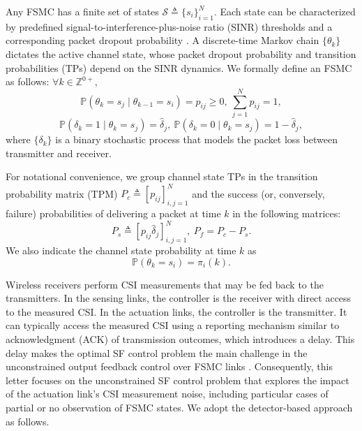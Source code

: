 \documentclass[journal,twoside,web]{ieeecolor}
\begin{document}
Any FSMC has a finite set of states $\mathcal{S}\triangleq\{s_i\}_{i=1}^{N}$. Each state can be characterized by predefined signal-to-interference-plus-noise ratio (SINR) thresholds and a corresponding packet dropout probability \cite{zacchialun2024access}. A discrete-time Markov chain $\{\theta_k\}$ dictates the active channel state, whose packet dropout probability and transition probabilities (TPs) depend on the SINR dynamics. We formally define an FSMC as follows: $\forall k\in \mathbb{Z}^{0+}$,
\begin{equation}\label{eq:p-ij}
    \mathbb{P}(\theta_{k} = s_j \mid \theta_{k-1} = s_i) = p_{ij} \geq 0,~ \sum_{j=1}^N p_{ij} = 1,
\end{equation}
\begin{equation}\label{eq:p-delta}
    \mathbb{P}(\delta_k = 1 \mid \theta_{k} = s_j) = \hat{\delta}_{j},~
    \mathbb{P}(\delta_k = 0 \mid \theta_{k} = s_j) = 1 - \hat{\delta}_{j},
\end{equation}
where $\{\delta_k\}$ is a binary stochastic process that models the packet loss between transmitter and receiver.

For notational convenience, we group
channel state TPs in the transition probability matrix (TPM) $P_{c}^{} \triangleq [p_{ij}]_{i,j=1}^{N}$
and the  success (or, conversely, failure) probabilities of delivering a packet at time $k$ in the following matrices:
\begin{equation}\label{eq:Ps}
    P_{s}^{} \triangleq [p_{ij}\hat{\delta}_{j}]_{i,j=1}^{N},~P_{f} = P_{c} - P_{s}.
\end{equation}
We also indicate the channel state probability at time $k$ as
\begin{equation}\label{eq:pik}
     \mathbb{P}(\theta_{k} = s_i) = \pi_{i}(k).
\end{equation}

Wireless receivers perform CSI measurements that may be fed back to the transmitters. In the sensing links, the controller is the receiver with direct access to the measured CSI. In the actuation links, the controller is the transmitter. It can typically access the measured CSI using a reporting mechanism similar to acknowledgment (ACK) of transmission outcomes, which introduces a delay. This delay makes the optimal SF control problem the main challenge in the unconstrained output feedback control over FSMC links \cite{impicciatore2024tac}. Consequently, this letter focuses on the unconstrained SF control problem that explores the impact of the actuation link's CSI measurement noise, including particular cases of partial or no observation of FSMC states. We adopt the detector-based approach as follows.
\end{document}
